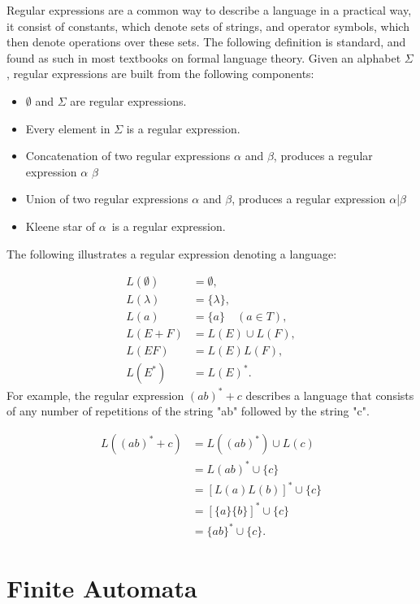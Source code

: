 Regular expressions are a common way to describe a language in a practical way, 
it consist of constants, which denote sets of strings, and operator symbols, which then denote operations over these sets. 
The following definition is standard, and found as such in most textbooks on formal language theory.
Given an alphabet \( \Sigma \), regular expressions are built from the following components:
\begin{itemize}
    \item \(\emptyset\) and \( \Sigma \) are regular expressions.
    \item Every element in \( \Sigma \) is a regular expression.
    \item Concatenation of two regular expressions \(\alpha\) and \(\beta\), produces a regular expression \(\alpha\) \(\beta\)
    \item Union of two regular expressions \(\alpha\) and \(\beta\), produces a regular expression \(\alpha\)|\(\beta\)
    \item Kleene star of \(\alpha\)\ is a regular expression.
\end{itemize}
The following illustrates a regular expression denoting a language:

\begin{align*}
L(\emptyset) &= \emptyset, \\
L(\lambda) &= \{\lambda\}, \\
L(a) &= \{a\} \quad (a \in T), \\
L(E + F) &= L(E) \cup L(F), \\
L(EF) &= L(E)L(F), \\
L(E^*) &= L(E)^*.
\end{align*}
For example, the regular expression \( (ab)^* + c \) describes a language that consists of any number of repetitions of the string "ab" followed by the string "c".

\begin{align*}
L((ab)^* + c) &= L((ab)^*) \cup L(c) \\
              &= L(ab)^* \cup \{c\} \\
              &= [L(a)L(b)]^* \cup \{c\} \\
              &= [\{a\}\{b\}]^* \cup \{c\} \\
              &= \{ab\}^* \cup \{c\}.
\end{align*}

\section{Finite Automata}

